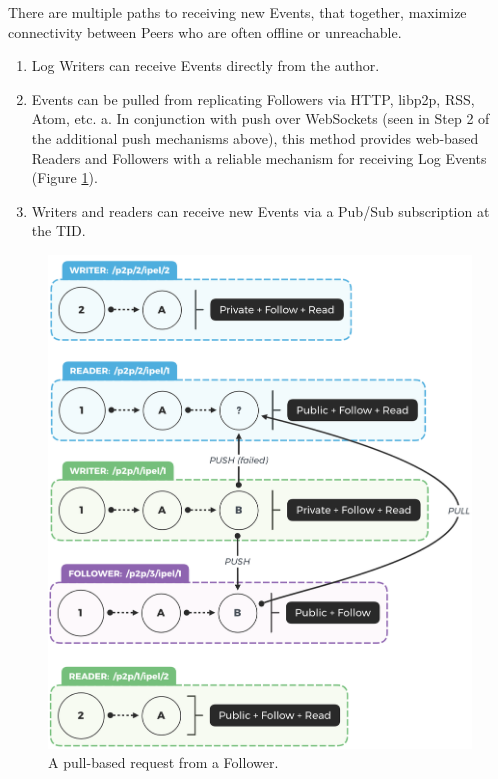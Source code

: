 \documentclass{textile}
\begin{document}
There are multiple paths to receiving new Events, that together, maximize connectivity between Peers who are often offline or unreachable.

\begin{enumerate}
\item Log Writers can receive Events directly from the author.
\item Events can be pulled from replicating Followers via HTTP, libp2p, RSS, Atom, etc.
    a. In conjunction with push over WebSockets (seen in Step 2 of the additional push mechanisms above), this method provides web-based Readers and Followers with a reliable mechanism for receiving Log Events (Figure \ref{fig:Pulling}).
\item Writers and readers can receive new Events via a Pub/Sub subscription at the TID.
\end{enumerate}

\begin{figure}
  \includegraphics[width=\linewidth]{figures/Pulling.png}
  \caption{A pull-based request from a Follower.}
  \label{fig:Pulling}
\end{figure}
\end{document}
